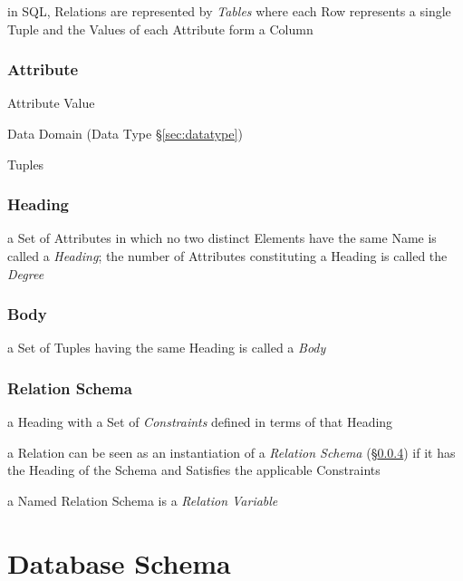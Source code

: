 in SQL, Relations are represented by \emph{Tables} where each Row represents a
single Tuple and the Values of each Attribute form a Column



\subsubsection{Attribute}\label{sec:database_attribute}

Attribute Value

Data Domain (Data Type \S\ref{sec:datatype})

Tuples



\subsubsection{Heading}\label{sec:heading}

a Set of Attributes in which no two distinct Elements have the same Name is
called a \emph{Heading}; the number of Attributes constituting a Heading is
called the \emph{Degree}



\subsubsection{Body}\label{sec:body}

a Set of Tuples having the same Heading is called a \emph{Body}



\subsubsection{Relation Schema}\label{sec:relation_schema}

a Heading with a Set of \emph{Constraints} defined in terms of that Heading

a Relation can be seen as an instantiation of a \emph{Relation Schema}
(\S\ref{sec:relation_schema}) if it has the Heading of the Schema and Satisfies
the applicable Constraints

a Named Relation Schema is a \emph{Relation Variable}



\section{Database Schema}\label{sec:database_schema}
